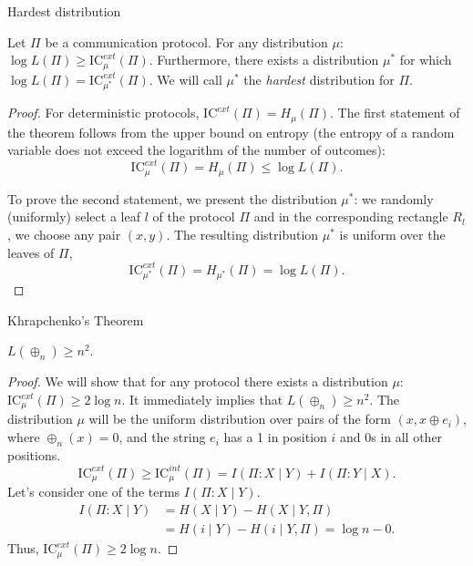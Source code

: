 \documentclass[
aspectratio=169]{beamer}
\newcommand{\IC}{\mathrm{IC}}
\begin{document}
\begin{frame}{Hardest distribution}
\begin{theorem}
    Let $\Pi$ be a communication protocol. For any distribution $\mu$:
    \(
    \log L(\Pi) \ge \IC_\mu^{ext}(\Pi).
    \)
    Furthermore, there exists a distribution $\mu^*$ for which
    \(
    \log L(\Pi) = \IC_{\mu^*}^{ext}(\Pi).
    \)
    We will call $\mu^*$ the \emph{hardest} distribution for $\Pi$.
\end{theorem}\pause
\begin{proof} For deterministic protocols, $\IC^{ext}(\Pi) = H_\mu(\Pi)$.
    The first statement of the theorem follows from the upper bound on entropy (the entropy
    of a random variable does not exceed the logarithm of the number of outcomes):
    \[
    \IC_\mu^{ext}(\Pi) = H_\mu(\Pi) \le \log L(\Pi).
    \]

    \pause
    To prove the second statement, we present the distribution $\mu^*$:
    we randomly (uniformly) select a leaf $l$ of the protocol $\Pi$ and in the corresponding rectangle $R_l$, we choose any pair $(x,y)$. The resulting distribution $\mu^*$ is uniform over the leaves of $\Pi$,
    \[
    \IC_{\mu^*}^{ext}(\Pi) = H_{\mu^*}(\Pi) = \log L(\Pi).
    \]
\end{proof}
\end{frame}

\begin{frame}{Khrapchenko's Theorem}
\begin{theorem}[Khrapchenko]
    $L(\oplus_n) \ge n^2$.
\end{theorem}
\begin{proof}
    We will show that for any protocol there exists a distribution $\mu$: $\IC^{ext}_\mu(\Pi) \ge 2\log n$.
    \pause
    It immediately implies that $L(\oplus_n) \ge n^2$.
    The distribution $\mu$ will be the uniform distribution over pairs of the form $(x,x \oplus e_i)$,
    where $\oplus_n(x) = 0$, and the string $e_i$ has a 1 in position $i$ and 0s in all other positions.
    \pause
    \[
    \IC_\mu^{ext}(\Pi)
    \ge \IC_\mu^{int}(\Pi)
    = I(\Pi:X \mid Y) + I(\Pi:Y \mid X).
    \]
    \pause Let's consider one of the terms $I(\Pi:X \mid Y)$.
    \[\begin{aligned}
        I(\Pi:X \mid Y) &= H(X \mid Y) - H(X \mid Y,\Pi)\\
        &= H(i \mid Y) - H(i \mid Y,\Pi) = \log n - 0.
    \end{aligned}\]
    \pause Thus, $\IC_\mu^{ext}(\Pi) \ge 2\log n$.
    \end{proof}
\end{frame}
\end{document}

